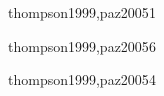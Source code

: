 \begin{syllabus}
\begin{unit}{\PLSEVENDef}{thompson1999,paz2005}{1}

   \begin{topics}
      \item \PLSEVENTopicPanorama
      \item \PLSEVENTopicRecursion
      \item \PLSEVENTopicPragmaticas
      \item \PLSEVENTopicCerraduras
   \end{topics}

   \begin{learningoutcomes}
      \item \PLSEVENObjONE
      \item \PLSEVENObjTWO
   \end{learningoutcomes}

\end{unit}

\begin{unit}{\PFFOURDef}{thompson1999,paz2005}{6}
   \begin{topics}
      \item \PFFOURTopicEl
      \item \PFFOURTopicFunciones
      \item \PFFOURTopicProcedimientos
      \item \PFFOURTopicEstrategias
      \item \PFFOURTopicBacktracking
      \item \PFFOURTopicImplementacion
   \end{topics}

   \begin{learningoutcomes}
      \item \PFFOURObjONE
      \item \PFFOURObjTWO
      \item \PFFOURObjTHREE
      \item \PFFOURObjFOUR
      \item \PFFOURObjFIVE
      \item \PFFOURObjSIX
      \item \PFFOURObjSEVEN
   \end{learningoutcomes}
\end{unit}

\begin{unit}{\ALTHREEDef}{thompson1999,paz2005}{4}
   \begin{topics}
      \item \ALTHREETopicAlgoritmos
      \item \ALTHREETopicBusqueda
      \item \ALTHREETopicAlgoritmoscuadraticos
      \item \ALTHREETopicAlgoritmosde
      \item \ALTHREETopicArboles
   \end{topics}


\end{unit}
\end{syllabus}
